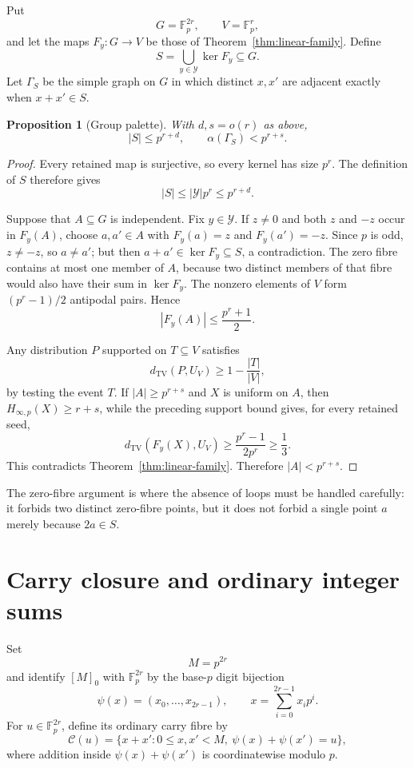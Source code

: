 \documentclass[11pt]{article}
\numberwithin{equation}{section}
\newtheorem{proposition}[theorem]{Proposition}
\theoremstyle{definition}
\theoremstyle{remark}
\newcommand{\F}{\mathbb F}
\newcommand{\TV}{d_{\mathrm{TV}}}
\newcommand{\calC}{\mathcal C}
\begin{document}
Put
\[
 G=\F_p^{2r},\qquad V=\F_p^r,
\]
and let the maps $F_y:G\to V$ be those of
Theorem~\ref{thm:linear-family}.  Define
\[
 S=\bigcup_{y\in\mathcal Y}\ker F_y\subseteq G.
\]
Let $\Gamma_S$ be the simple graph on $G$ in which distinct $x,x'$ are
adjacent exactly when $x+x'\in S$.

\begin{proposition}[Group palette]\label{prop:group-palette}
With $d,s=o(r)$ as above,
\[
 |S|\le p^{r+d},
 \qquad
 \alpha(\Gamma_S)<p^{r+s}.
\]
\end{proposition}

\begin{proof}
Every retained map is surjective, so every kernel has size $p^r$.
The definition of $S$ therefore gives
\[
 |S|\le|\mathcal Y|p^r\le p^{r+d}.
\]

Suppose that $A\subseteq G$ is independent.  Fix $y\in\mathcal Y$.  If
$z\ne0$ and both $z$ and $-z$ occur in $F_y(A)$, choose $a,a'\in A$ with
$F_y(a)=z$ and $F_y(a')=-z$.  Since $p$ is odd, $z\ne-z$, so $a\ne a'$;
but then $a+a'\in\ker F_y\subseteq S$, a contradiction.  The zero fibre
contains at most one member of $A$, because two distinct members of that
fibre would also have their sum in $\ker F_y$.  The nonzero elements of
$V$ form $(p^r-1)/2$ antipodal pairs.  Hence
\[
 |F_y(A)|\le\frac{p^r+1}{2}.
\]

Any distribution $P$ supported on $T\subseteq V$ satisfies
\[
 \TV(P,U_V)\ge1-\frac{|T|}{|V|},
\]
by testing the event $T$.  If $|A|\ge p^{r+s}$ and $X$ is uniform on
$A$, then $H_{\infty,p}(X)\ge r+s$, while the preceding support bound gives,
for every retained seed,
\[
 \TV(F_y(X),U_V)
 \ge\frac{p^r-1}{2p^r}\ge\frac13.
\]
This contradicts Theorem~\ref{thm:linear-family}.  Therefore
$|A|<p^{r+s}$.
\end{proof}

The zero-fibre argument is where the absence of loops must be handled
carefully: it forbids two distinct zero-fibre points, but it does not
forbid a single point $a$ merely because $2a\in S$.

\section{Carry closure and ordinary integer sums}\label{sec:carries}

Set
\[
 M=p^{2r}
\]
and identify $[M]_0$ with $\F_p^{2r}$ by the base-$p$ digit bijection
\[
 \psi(x)=(x_0,\ldots,x_{2r-1}),
 \qquad x=\sum_{i=0}^{2r-1}x_i p^i.
\]
For $u\in\F_p^{2r}$, define its ordinary carry fibre by
\begin{equation}\label{eq:carry-fibre}
 \calC(u)=\{x+x':0\le x,x'<M,\ \psi(x)+\psi(x')=u\},
\end{equation}
where addition inside $\psi(x)+\psi(x')$ is coordinatewise modulo $p$.
\end{document}
